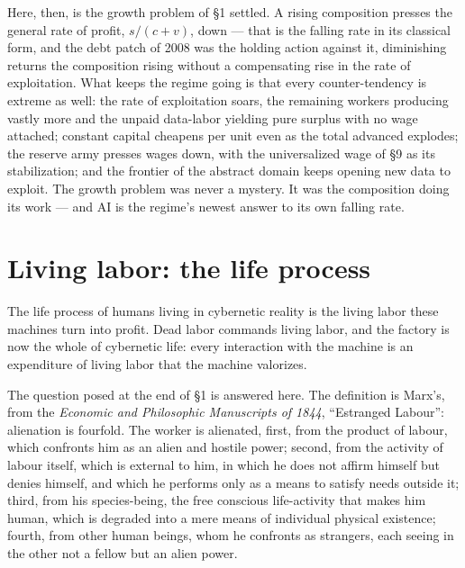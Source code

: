 \documentclass[11pt]{article}
\begin{document}
Here, then, is the growth problem of \S 1 settled. A rising
composition presses the general rate of profit, $s/(c+v)$, down ---
that is the falling rate in its classical form, and the debt patch of
2008 was the holding action against it, diminishing returns the
composition rising without a compensating rise in the rate of
exploitation. What keeps the regime going is that every
counter-tendency is extreme as well: the rate of exploitation soars,
the remaining workers producing vastly more and the unpaid data-labor
yielding pure surplus with no wage attached; constant capital cheapens
per unit even as the total advanced explodes; the reserve army presses
wages down, with the universalized wage of \S 9 as its stabilization;
and the frontier of the abstract domain keeps opening new data to
exploit. The growth problem was never a mystery. It was the
composition doing its work --- and AI is the regime's newest answer to
its own falling rate.

\section{Living labor: the life process}

The life process of humans living in cybernetic reality is the living
labor these machines turn into profit. Dead labor commands living labor,
and the factory is now the whole of cybernetic life: every interaction
with the machine is an expenditure of living labor that the machine
valorizes.

The question posed at the end of §1 is answered here. The definition
is Marx's, from the \textit{Economic and Philosophic Manuscripts of
1844}, ``Estranged Labour'': alienation is fourfold. The worker is
alienated, first, from the product of labour, which confronts him as an
alien and hostile power; second, from the activity of labour itself,
which is external to him, in which he does not affirm himself but denies
himself, and which he performs only as a means to satisfy needs outside
it; third, from his species-being, the free conscious life-activity that
makes him human, which is degraded into a mere means of individual
physical existence; fourth, from other human beings, whom he confronts
as strangers, each seeing in the other not a fellow but an alien power.
\end{document}
